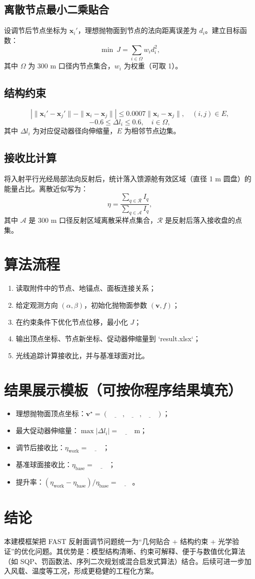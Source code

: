 \documentclass[12pt,a4paper]{ctexart}
\begin{document}
\subsection{离散节点最小二乘贴合}
设调节后节点坐标为 $\mathbf x_i'$，理想抛物面到节点的法向距离误差为 $d_i$。建立目标函数：
\[
\min\ J=\sum_{i\in\Omega}w_i d_i^2,
\]
其中 $\Omega$ 为 300 m 口径内节点集合，$w_i$ 为权重（可取 1）。

\subsection{结构约束}
\[
\left|\|\mathbf x_i'-\mathbf x_j'\|-\|\mathbf x_i-\mathbf x_j\|\right|
\le 0.0007\|\mathbf x_i-\mathbf x_j\|,\quad (i,j)\in E,
\]
\[
-0.6\le \Delta l_i\le 0.6,\quad i\in\Omega,
\]
其中 $\Delta l_i$ 为对应促动器径向伸缩量，$E$ 为相邻节点边集。

\subsection{接收比计算}
将入射平行光经局部法向反射后，统计落入馈源舱有效区域（直径 1 m 圆盘）的能量占比。离散近似写为：
\[
\eta=\frac{\sum_{q\in\mathcal R}I_q}{\sum_{q\in\mathcal A}I_q},
\]
其中 $\mathcal A$ 是 300 m 口径反射区域离散采样点集合，$\mathcal R$ 是反射后落入接收盘的点集。

\section{算法流程}
\begin{enumerate}
  \item 读取附件中的节点、地锚点、面板连接关系；
  \item 给定观测方向 $(\alpha,\beta)$，初始化抛物面参数 $(\mathbf v,f)$；
  \item 在约束条件下优化节点位移，最小化 $J$；
  \item 输出顶点坐标、节点新坐标、促动器伸缩量到 `result.xlsx`；
  \item 光线追踪计算接收比，并与基准球面对比。
\end{enumerate}

\section{结果展示模板（可按你程序结果填充）}
\begin{itemize}
  \item 理想抛物面顶点坐标：$\mathbf v^\star=(\underline{\qquad},\underline{\qquad},\underline{\qquad})$；
  \item 最大促动器伸缩量：$\max |\Delta l_i|=\underline{\qquad}\,\mathrm m$；
  \item 调节后接收比：$\eta_{\text{work}}=\underline{\qquad}$；
  \item 基准球面接收比：$\eta_{\text{base}}=\underline{\qquad}$；
  \item 提升率：$(\eta_{\text{work}}-\eta_{\text{base}})/\eta_{\text{base}}=\underline{\qquad}$。
\end{itemize}

\section{结论}
本建模框架把 FAST 反射面调节问题统一为“几何贴合 + 结构约束 + 光学验证”的优化问题。其优势是：模型结构清晰、约束可解释、便于与数值优化算法（如 SQP、罚函数法、序列二次规划或混合启发式算法）结合。后续可进一步加入风载、温度等工况，形成更稳健的工程化方案。
\end{document}
